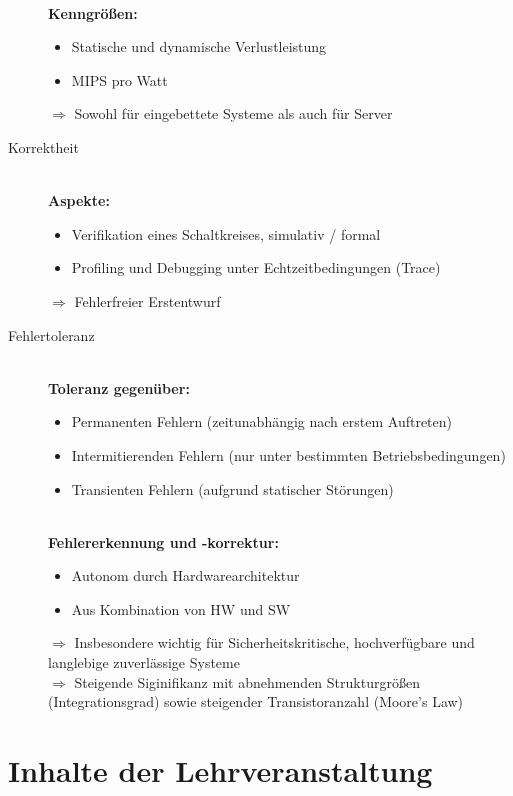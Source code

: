 \begin{description}
			\hfill\\\textbf{Kenngrößen:}
			\begin{itemize}
				\item Statische und dynamische Verlustleistung
				\item MIPS pro Watt
			\end{itemize}
		
			$\Rightarrow$ Sowohl für eingebettete Systeme als auch für Server
		
		
		\item[Korrektheit]
			\hfill\\\textbf{Aspekte:}
			\begin{itemize}
				\item Verifikation eines Schaltkreises, simulativ / formal
				\item Profiling und Debugging unter Echtzeitbedingungen (Trace)
			\end{itemize}
			$\Rightarrow$ Fehlerfreier Erstentwurf
		
		
		\item[Fehlertoleranz]\hfill
			\\\textbf{Toleranz gegenüber:}
			\begin{itemize}
				\item Permanenten Fehlern (zeitunabhängig nach erstem Auftreten)
				\item Intermitierenden Fehlern (nur unter bestimmten Betriebsbedingungen)
				\item Transienten Fehlern (aufgrund statischer Störungen)
			\end{itemize}
		
			\hfill\\\textbf{Fehlererkennung und -korrektur:}
			\begin{itemize}
				\item Autonom durch Hardwarearchitektur
				\item Aus Kombination von HW und SW
			\end{itemize}
		
			$\Rightarrow$ Insbesondere wichtig für Sicherheitskritische, hochverfügbare und langlebige zuverlässige Systeme
			\\$\Rightarrow$ Steigende Siginifikanz mit abnehmenden Strukturgrößen (Integrationsgrad) sowie steigender Transistoranzahl (Moore's Law)
	\end{description}


\section{Inhalte der Lehrveranstaltung}
